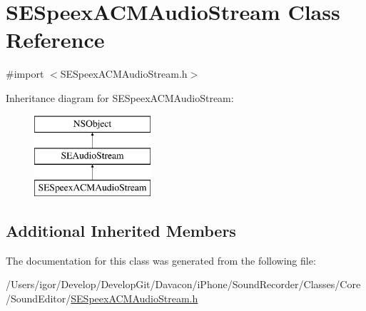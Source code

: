 \hypertarget{interface_s_e_speex_a_c_m_audio_stream}{\section{S\-E\-Speex\-A\-C\-M\-Audio\-Stream Class Reference}
\label{interface_s_e_speex_a_c_m_audio_stream}
}


{\ttfamily \#import $<$S\-E\-Speex\-A\-C\-M\-Audio\-Stream.\-h$>$}

Inheritance diagram for S\-E\-Speex\-A\-C\-M\-Audio\-Stream\-:\begin{figure}[H]
\begin{center}
\leavevmode
\includegraphics[height=3.000000cm]{interface_s_e_speex_a_c_m_audio_stream}
\end{center}
\end{figure}
\subsection*{Additional Inherited Members}


The documentation for this class was generated from the following file\-:\begin{DoxyCompactItemize}
\item 
/\-Users/igor/\-Develop/\-Develop\-Git/\-Davacon/i\-Phone/\-Sound\-Recorder/\-Classes/\-Core/\-Sound\-Editor/\hyperlink{_s_e_speex_a_c_m_audio_stream_8h}{S\-E\-Speex\-A\-C\-M\-Audio\-Stream.\-h}\end{DoxyCompactItemize}
